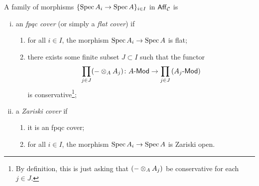 
        \begin{definition}\label{df:fpqc-zariski-covers}
            A family of morphisms $\{\operatorname{Spec} A_i\to\operatorname{Spec} A\}_{i\in I}$ in $\mathsf{Aff}_{\mathcal{C}}$ is
            \begin{enumerate}[(i)]
                \item an \emph{fpqc cover} (or simply a \emph{flat cover}) if
                    \begin{enumerate}
                        \item for all $i\in I$, the morphism $\operatorname{Spec} A_i\to\operatorname{Spec} A$ is flat;
                        \item there exists some finite subset $J\subset I$ such that the functor
                            \begin{equation*}
                                \prod_{j\in J}({-}\otimes_A A_j)\colon{{A}\hbox{-}\mathsf{Mod}}\to\prod_{j\in J}\left({{A_j}\hbox{-}\mathsf{Mod}}\right)
                            \end{equation*}
                            is conservative\footnote{
                                By definition, this is just asking that $({-}\otimes_A A_j)$ be conservative for each $j\in J$.
                            };
                    \end{enumerate}
                \item a \emph{Zariski cover} if
                    \begin{enumerate}
                        \item it is an fpqc cover;
                        \item for all $i\in I$, the morphism $\operatorname{Spec} A_i\to \operatorname{Spec} A$ is Zariski open.\qedhere
                    \end{enumerate}
            \end{enumerate}
        \end{definition}

